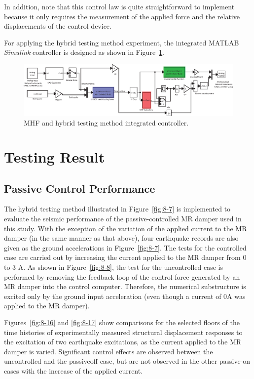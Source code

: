 In addition, note that this control law is quite straightforward to implement because it only requires the measurement of the applied force and the relative displacements of the control device.

For applying the hybrid testing method experiment, the integrated MATLAB \textit{Simulink} controller is designed as shown in Figure~\ref{fig:8-15}.

\begin{figure}[H]
\centering
\includegraphics[width=1\textwidth] {figure/8-15.eps}
\caption{MHF and hybrid testing method integrated controller.}
\label{fig:8-15}
\end{figure}

\section{Testing Result}
\subsection{Passive Control Performance}

The hybrid testing method illustrated in Figure~\ref{fig:8-7} is implemented to evaluate the seismic performance of the passive-controlled MR damper used in this study. With the exception of the variation of the applied current to the MR damper (in the same manner as that above), four earthquake records are also given as the ground accelerations in Figure~\ref{fig:8-7}. The tests for the controlled case are carried out by increasing the current applied to the MR damper from 0 to 3 A. As shown in Figure~\ref{fig:8-8}, the test for the uncontrolled case is performed by removing the feedback loop of the control force generated by an MR damper into the control computer. Therefore, the numerical substructure is excited only by the ground input acceleration (even though a current of 0A was applied to the MR damper).

Figures~\ref{fig:8-16} and \ref{fig:8-17} show comparisons for the selected floors of the time histories of experimentally measured structural displacement responses to the excitation of two earthquake excitations, as the current applied to the MR damper is varied. Significant control effects are observed between the uncontrolled and the passiveoff case, but are not observed in the other passive-on cases with the increase of the applied current.

